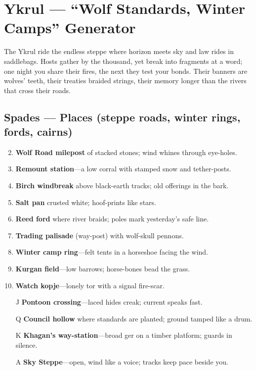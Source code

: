 \section{Ykrul --- ``Wolf Standards, Winter Camps'' Generator}
\label{chap:ykrul}

\noindent
The Ykrul ride the endless steppe where horizon meets sky and law rides in saddlebags. Hosts gather by the thousand, yet break into fragments at a word; one night you share their fires, the next they test your bonds. Their banners are wolves’ teeth, their treaties braided strings, their memory longer than the rivers that cross their roads.

\subsection*{Spades --- Places (steppe roads, winter rings, fords, cairns)}
\begin{enumerate}
\setcounter{enumi}{1}
\item \textbf{Wolf Road milepost} of stacked stones; wind whines through eye-holes.
\item \textbf{Remount station}---a low corral with stamped snow and tether-posts.
\item \textbf{Birch windbreak} above black-earth tracks; old offerings in the bark.
\item \textbf{Salt pan} crusted white; hoof-prints like stars.
\item \textbf{Reed ford} where river braids; poles mark yesterday's safe line.
\item \textbf{Trading palisade} (way-post) with wolf-skull pennons.
\item \textbf{Winter camp ring}---felt tents in a horseshoe facing the wind.
\item \textbf{Kurgan field}---low barrows; horse-bones bead the grass.
\item \textbf{Watch kopje}---lonely tor with a signal fire-scar.
\item[J] \textbf{Pontoon crossing}---laced hides creak; current speaks fast.
\item[Q] \textbf{Council hollow} where standards are planted; ground tamped like a drum.
\item[K] \textbf{Khagan's way-station}---broad ger on a timber platform; guards in silence.
\item[A] \textbf{Sky Steppe}---open, wind like a voice; tracks keep pace beside you.
\end{enumerate}

